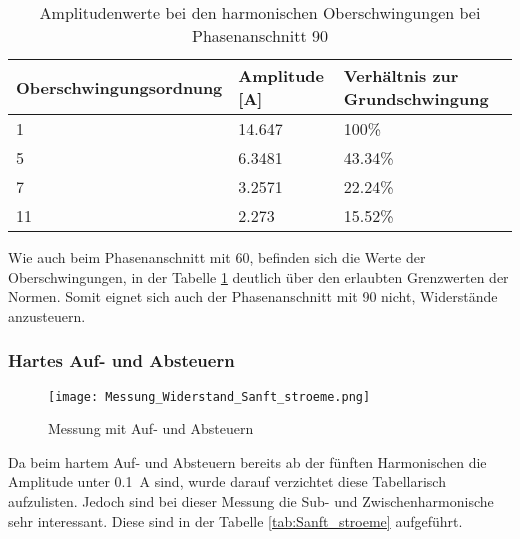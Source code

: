\begin{table}[ht!]
	\centering
	\begin{tabular}{|l|l|l|}
		\hline
		Oberschwingungsordnung 	& Amplitude [A] & Verhältnis zur Grundschwingung	\\ \hline
		1       				& 14.647   		& 100\%								\\ \hline
		5      					& 6.3481    	& 43.34\%							\\ \hline
		7      					& 3.2571    	& 22.24\%							\\ \hline
		11      				& 2.273    		& 15.52\%							\\ \hline
	\end{tabular}
	\caption{Amplitudenwerte bei den harmonischen Oberschwingungen bei Phasenanschnitt 90\textdegree}\label{tab:Phas_90_Stroeme}
\end{table}

Wie auch beim Phasenanschnitt mit 60\textdegree, befinden sich die Werte der Oberschwingungen, in der Tabelle \ref{tab:Phas_90_Stroeme} deutlich über den erlaubten Grenzwerten der Normen. Somit eignet sich auch der Phasenanschnitt mit 90\textdegree \hspace{0.02cm} nicht, Widerstände anzusteuern. 



\newpage
\subsubsection*{Hartes Auf- und Absteuern}
\begin{figure}[ht!]
	\centering
	\texttt{[image: Messung\_Widerstand\_Sanft\_stroeme.png]}	
	\caption{Messung mit Auf- und Absteuern}\label{fig:Mess_Widerstand_Sanft_stroeme}
\end{figure}
Da beim hartem Auf- und Absteuern bereits ab der fünften Harmonischen die Amplitude unter \SI{0.1}{A} sind, wurde darauf verzichtet diese Tabellarisch aufzulisten. Jedoch sind bei dieser Messung die Sub- und Zwischenharmonische sehr interessant. Diese sind in der Tabelle \ref{tab:Sanft_stroeme} aufgeführt.

